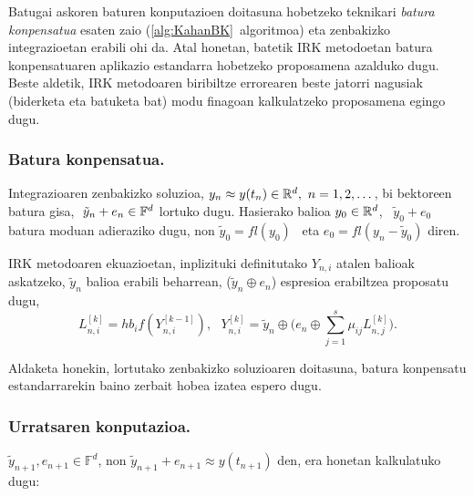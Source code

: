 Batugai askoren baturen konputazioen doitasuna hobetzeko teknikari \emph{batura konpensatua} esaten zaio (\ref{alg:KahanBK}~algoritmoa) eta zenbakizko integrazioetan erabili ohi da. Atal honetan, batetik IRK metodoetan batura konpensatuaren aplikazio estandarra hobetzeko proposamena azalduko dugu. Beste aldetik, IRK metodoaren biribiltze errorearen beste jatorri nagusiak (biderketa eta batuketa bat) modu finagoan kalkulatzeko proposamena egingo dugu.    


\subsubsection*{Batura konpensatua.}

Integrazioaren zenbakizko soluzioa, $y_n \approx y(t_n) \in \mathbb{R}^{d}, \ n=1,2,\dots$, bi bektoreen batura gisa, $ \ \tilde{y}_n+e_n \in \mathbb{F}^{d}$ lortuko dugu. Hasierako balioa $y_0 \in \mathbb{R}^{d}$, \ $\tilde{y}_0+e_0$ batura moduan adieraziko dugu, non $\tilde{y}_0=fl(y_0)$~ eta $e_0=fl(y_n-\tilde{y}_0)$ diren. 

IRK metodoaren ekuazioetan, inplizituki definitutako $Y_{n,i}$ atalen balioak askatzeko, $\tilde {y}_n$ balioa erabili beharrean, ($\tilde{y}_n \oplus e_{n}$) espresioa erabiltzea proposatu dugu, 
\begin{equation}
\label{eq:eqbk}
L_{n,i}^{[k]}=hb_if(Y_{n,i}^{[k-1]}), \ \ \ Y_{n,i}^{[k]}=\tilde{y}_n \oplus \big(e_{n} \oplus \sum\limits_{j=1}^{s} \mu_{ij} L_{n,j}^{[k]}\big).
\end{equation}

Aldaketa honekin, lortutako zenbakizko soluzioaren doitasuna, batura konpensatu estandarrarekin baino zerbait hobea izatea espero dugu. 

\subsubsection*{Urratsaren konputazioa.}

$\tilde{y}_{n+1}, e_{n+1} \in \mathbb{F}^d$, non $\tilde{y}_{n+1}+e_{n+1}\approx y(t_{n+1})$ den, era honetan kalkulatuko dugu:

